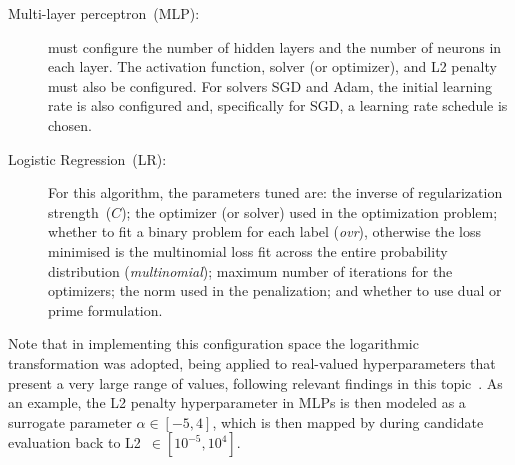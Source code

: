 \begin{description}
\item[Multi-layer perceptron~(MLP):]
\irace must configure the number of hidden layers and the number of neurons in each layer. The activation function, solver (or optimizer), and L2 penalty must also be configured. For solvers SGD and Adam, the initial learning rate is also configured and, specifically for SGD, a learning rate schedule is chosen.

\item[Logistic Regression~(LR):]
For this algorithm, the parameters tuned are: the inverse of regularization strength~($C$); the optimizer (or solver) used in the optimization problem; whether to fit a binary problem for each label (\textit{ovr}), otherwise the loss minimised is the multinomial loss fit across the entire probability distribution (\textit{multinomial}); maximum number of iterations for the optimizers; the norm used in the penalization; and whether to use dual or prime formulation.
\end{description}

Note that in implementing this configuration space the logarithmic transformation was adopted, being applied to real-valued hyperparameters that present a very large range of values, following relevant findings in this topic~\cite{franzin2017effect}. As an example, the L2 penalty hyperparameter in MLPs is then modeled as a surrogate parameter $\alpha \in [-5,4]$, which is then mapped by \isklearn during candidate evaluation back to \mbox{L2 $\in [10^{-5}, 10^4]$}.
